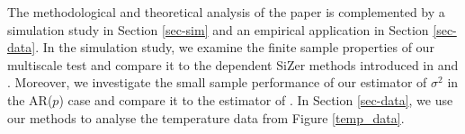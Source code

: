 The methodological and theoretical analysis of the paper is complemented by a simulation study in Section \ref{sec-sim} and an empirical application in Section \ref{sec-data}. In the simulation study, we examine the finite sample properties of our multiscale test and compare it to the dependent SiZer methods introduced in \cite{Rondonotti2004} and \cite{Rondonotti2007}. Moreover, we investigate the small sample performance of our estimator of $\sigma^2$ in the AR($p$) case and compare it to the estimator of \cite{Hall2003}. In Section \ref{sec-data}, we use our methods to analyse the temperature data from Figure \ref{temp_data}. 


